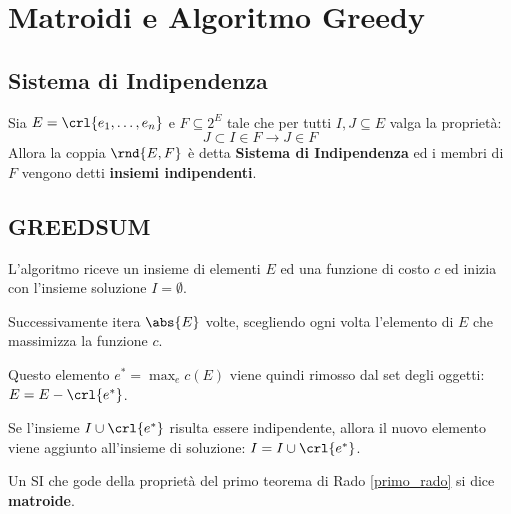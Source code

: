 \documentclass[\main/main.tex]{subfiles}
\begin{document}
\chapter{Matroidi e Algoritmo Greedy}
\section{Sistema di Indipendenza}
\begin{definition}
  Sia \(E = \crl{e_1, \ldots, e_n}\) e \(F \subseteq 2^E\) tale che per tutti \(I, J \subseteq E\) valga la proprietà:
  \[
    J \subset I \in F \rightarrow J \in F
  \]
  Allora la coppia \(\rnd{E, F}\) è detta \textbf{Sistema di Indipendenza} ed i membri di \(F\) vengono detti \textbf{insiemi indipendenti}.
\end{definition}
\section{GREEDSUM}
L'algoritmo riceve un insieme di elementi \(E\) ed una funzione di costo \(c\) ed inizia con l'insieme soluzione \(I = \emptyset \).

Successivamente itera \(\abs{E}\) volte, scegliendo ogni volta l'elemento di \(E\) che massimizza la funzione \(c\).

Questo elemento \(e^* = \max_e c(E)\) viene quindi rimosso dal set degli oggetti: \(E = E - \crl{e^*}\).

Se l'insieme \(I \cup \crl{e^*}\) risulta essere indipendente, allora il nuovo elemento viene aggiunto all'insieme di soluzione: \(I = I \cup \crl{e^*}\).
\begin{definition}[Matroide]
  Un SI che gode della proprietà del primo teorema di Rado \ref{primo_rado} si dice \textbf{matroide}.
\end{definition}
\clearpage
\end{document}

